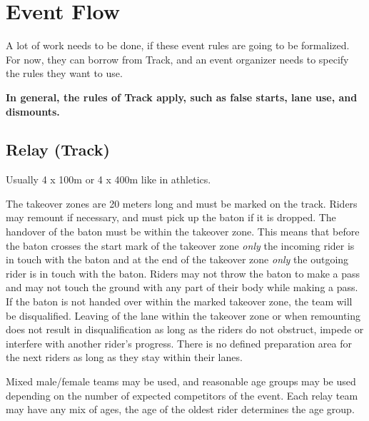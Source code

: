 \section{Event Flow}

\begin{framed}
  A lot of work needs to be done, if these event rules are going to be
  formalized.  For now, they can borrow from Track, and an event organizer
  needs to specify the rules they want to use.
\end{framed}

\textbf{In general, the rules of Track apply, such as false starts, lane use, and dismounts.}

\subsection{Relay (Track)}
Usually 4 x 100m or 4 x 400m like in athletics.

The takeover zones are 20 meters long and must be marked on the track.
Riders may remount if necessary, and must pick up the baton if it is dropped.
The handover of the baton must be within the takeover zone.
This means that before the baton crosses the start mark of the takeover zone \emph{only} the incoming rider is in touch with the baton and at the end of the takeover zone \emph{only} the outgoing rider is in touch with the baton.
Riders may not throw the baton to make a pass and may not touch the ground with any part of their body while making a pass.
If the baton is not handed over within the marked takeover zone, the team will be disqualified.
Leaving of the lane within the takeover zone or when remounting does not result in disqualification as long as the riders do not obstruct, impede or interfere with another rider's progress.
There is no defined preparation area for the next riders as long as they stay within their lanes.

Mixed male/female teams may be used, and reasonable age groups may be used depending on the number of expected competitors of the event.
Each relay team may have any mix of ages, the age of the oldest rider determines the age group.


